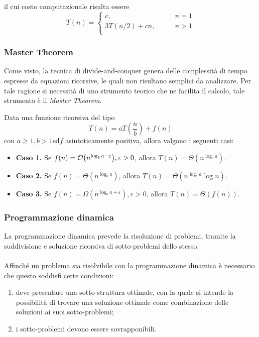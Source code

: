 \documentclass{subfiles}
\begin{document}
\noindent il cui costo computazionale risulta essere
\[
    T(n) = \begin{cases}
        c, \qquad            & n = 1 \\
        3T(n/2) + cn, \qquad & n > 1 \\
    \end{cases}
\]
\subsubsection{Master Theorem}
Come visto, la tecnica di divide-and-conquer genera delle complessità di tempo espresse da equazioni ricorsive, le quali non risultano semplici da analizzare.
Per tale ragione si necessità di uno strumento teorico che ne facilita il calcolo, tale strumento è il \emph{Master Theorem}.

\begin{Theorem*}[Master]
    Data una funzione ricorsiva del tipo
    \[
        T(n) = aT(\frac{n}{b}) + f(n)
    \]
    con \(a \ge 1, b > 1 \text{ed} f\) asintoticamente positiva, allora valgono i seguenti casi:
    \begin{itemize}
        \item \textbf{Caso 1.} Se \(f(n) = \order{n^{\log_{b}{a - \varepsilon}}}, \varepsilon > 0\),  allora \(T(n) = \Theta(n^{\log_{b}{a}})\).
        \item \textbf{Caso 2.} Se \(f(n) = \Theta(n^{\log_{b}{a}})\),  allora \(T(n) = \Theta(n^{\log_{b}{a}} \log n)\).
        \item \textbf{Caso 3.} Se \(f(n) = \Omega(n^{\log_{b}{a + \varepsilon}}), \varepsilon > 0\),  allora \(T(n) = \Theta(f(n))\).
    \end{itemize}
\end{Theorem*}
\clearpage

\subsubsection{Programmazione dinamica}
La programmazione dinamica prevede la risoluzione di problemi, tramite la suddivisione e soluzione ricorsiva di sotto-problemi dello stesso.
\\ \\
Affinché un problema sia risolvibile con la programmazione dinamica è necessario che questo soddisfi certe condizioni:
\begin{enumerate}
    \item deve presentare una sotto-struttura ottimale, con la quale si intende la possibilità di trovare una soluzione ottimale come combinazione delle soluzioni ai suoi sotto-problemi;
    \item i sotto-problemi devono essere sovrapponibili.
\end{enumerate}
\end{document}
